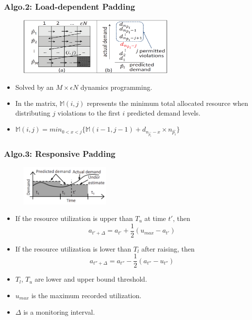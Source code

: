\documentclass{beamer}
\begin{document}
	\begin{frame}
	\frametitle{Algo.2: Load-dependent Padding}
		\begin{figure}[h!]
		\centering
		\includegraphics[width=0.7\textwidth]{./figure/alg2_1.PNG}
		\end{figure}
		\begin{itemize}
		\item Solved by an $M\times \epsilon N$ dynamics programming.
		\item In the matrix, $\mathbb{M}(i,j)$ represents the minimum total allocated resource when distributing $j$ violations to the first $i$ predicted demand levels.
		\item $\mathbb{M}(i,j)=min_{0<x<j}\{ \mathbb{M}(i-1,j-1)+d_{n_{\hat{p_{i}}}-x}\times n_{\hat{p_{i}}} \}$
		\end{itemize}
	\end{frame}

	\begin{frame}
	\frametitle{Algo.3: Responsive Padding}
		\begin{figure}[h!]
		\centering
		\includegraphics[width=0.4\textwidth]{./figure/alg3_1.PNG}
		\end{figure}
		\begin{itemize}
		\item If the resource utilization is upper than $T_{u}$ at time $t'$, then
		\begin{equation} a_{t'+\Delta}=a_{t'}+\frac{1}{2}(u_{max}-a_{t'}) \end{equation}
		\item If the resource utilization is lower than $T_{l}$ after raising, then
		\begin{equation} a_{t''+\Delta}=a_{t''}-\frac{1}{2}(a_{t''}-u_{t''}) \end{equation}
		\item $T_{l}$, $T_{u}$ are lower and upper bound threshold.
		\item $u_{max}$ is the maximum recorded utilization.
		\item $\Delta$ is a monitoring interval.
		\end{itemize}
	\end{frame}
\end{document}

